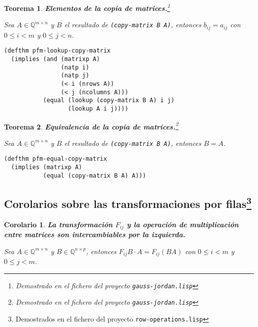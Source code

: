 \documentclass[a4paper,10pt]{article}
\newcommand{\M}[3]{#1 \in \mathbb{Q}^{#2 \times #3}}
\newtheorem{teor}{{Teorema}}
\newtheorem{coro}{{Corolario}}
\begin{document}
\par \vspace{16pt}

\begin{teor} \textbf{Elementos de la copia de matrices.}\footnote{Demostrado en el fichero del proyecto \texttt{gauss-jordan.lisp}}\vspace{8pt}\par
Sea $\M{A}{m}{n}$ y $B$ el resultado de \texttt{(copy-matrix B A)}, entonces $b_{ij}=a_{ij}$ con $0 \leq i < m$ y $0 \leq j < n$.
\end{teor}

\begin{lstlisting}[language=clips]
(defthm pfm-lookup-copy-matrix
  (implies (and (matrixp A)
                (natp i)
                (natp j)
                (< i (nrows A))
                (< j (ncolumns A)))
           (equal (lookup (copy-matrix B A) i j)
                  (lookup A i j))))
\end{lstlisting}

\par \vspace{16pt}

\begin{teor} \textbf{Equivalencia de la copia de matrices.}\footnote{Demostrado en el fichero del proyecto \texttt{gauss-jordan.lisp}}\vspace{8pt}\par
Sea $\M{A}{m}{n}$ y $B$ el resultado de \texttt{(copy-matrix B A)}, entonces $B = A$.
\end{teor}

\begin{lstlisting}[language=clips]
(defthm pfm-equal-copy-matrix
  (implies (matrixp A)
           (equal (copy-matrix B A) A)))
\end{lstlisting}

\vspace{12pt}
\subsection[Corolarios sobre las transformaciones por filas]{Corolarios sobre las transformaciones por filas\footnote{Demostrados en el fichero del proyecto \texttt{row-operations.lisp}}}
\vspace{10pt}

\begin{coro} \textbf{La transformación $F_{ij}$ y la operación de multiplicación entre matrices son intercambiables por la izquierda.}\vspace{8pt}\par
Sea $\M{A}{m}{n}$ y $\M{B}{n}{p}$, entonces $F_{ij}B\cdot A = F_{ij}(BA)$ con $0 \leq i < m$ y $0 \leq j < m$.
\end{coro}
\end{document}
